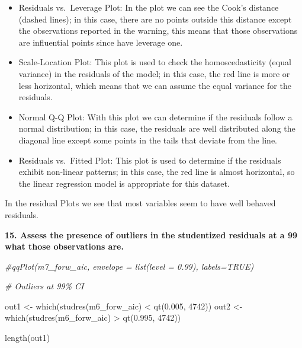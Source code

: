 \documentclass[
]{article}
\newenvironment{Shaded}{\begin{snugshade}}{\end{snugshade}}
\newcommand{\CommentTok}[1]{\textcolor[rgb]{0.56,0.35,0.01}{\textit{#1}}}
\newcommand{\DecValTok}[1]{\textcolor[rgb]{0.00,0.00,0.81}{#1}}
\newcommand{\FloatTok}[1]{\textcolor[rgb]{0.00,0.00,0.81}{#1}}
\newcommand{\FunctionTok}[1]{\textcolor[rgb]{0.00,0.00,0.00}{#1}}
\newcommand{\NormalTok}[1]{#1}
\newcommand{\OtherTok}[1]{\textcolor[rgb]{0.56,0.35,0.01}{#1}}
\newcommand{\SpecialCharTok}[1]{\textcolor[rgb]{0.00,0.00,0.00}{#1}}
\begin{document}
\begin{itemize}
\item
  Residuals vs.~Leverage Plot: In the plot we can see the Cook's
  distance (dashed lines); in this case, there are no points outside
  this distance except the observations reported in the warning, this
  means that those observations are influential points since have
  leverage one.
\item
  Scale-Location Plot: This plot is used to check the homoscedasticity
  (equal variance) in the residuals of the model; in this case, the red
  line is more or less horizontal, which means that we can assume the
  equal variance for the residuals.
\item
  Normal Q-Q Plot: With this plot we can determine if the residuals
  follow a normal distribution; in this case, the residuals are well
  distributed along the diagonal line except some points in the tails
  that deviate from the line.
\item
  Residuals vs.~Fitted Plot: This plot is used to determine if the
  residuals exhibit non-linear patterns; in this case, the red line is
  almost horizontal, so the linear regression model is appropriate for
  this dataset.
\end{itemize}

In the residual Plots we see that most variables seem to have well
behaved residuals. \newpage

\textbf{15. Assess the presence of outliers in the studentized residuals at a 99%
what those observations are.}

\begin{Shaded}
\begin{Highlighting}[]
\CommentTok{\#qqPlot(m7\_forw\_aic, envelope = list(level = 0.99), labels=TRUE)}

\CommentTok{\# Outliers at 99\% CI}

\NormalTok{out1 }\OtherTok{\textless{}{-}} \FunctionTok{which}\NormalTok{(}\FunctionTok{studres}\NormalTok{(m6\_forw\_aic) }\SpecialCharTok{\textless{}} \FunctionTok{qt}\NormalTok{(}\FloatTok{0.005}\NormalTok{, }\DecValTok{4742}\NormalTok{))}
\NormalTok{out2 }\OtherTok{\textless{}{-}} \FunctionTok{which}\NormalTok{(}\FunctionTok{studres}\NormalTok{(m6\_forw\_aic) }\SpecialCharTok{\textgreater{}} \FunctionTok{qt}\NormalTok{(}\FloatTok{0.995}\NormalTok{, }\DecValTok{4742}\NormalTok{))}

\FunctionTok{length}\NormalTok{(out1)}
\end{Highlighting}
\end{Shaded}
\end{document}
